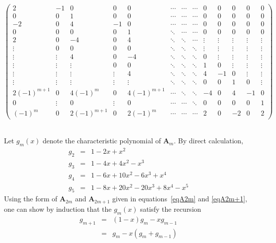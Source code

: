 \documentclass{amsart}
\begin{document}
\begin{tiny}

\begin{equation}\label{eqA2m+1}
\left( \begin{array}{ccccccccccccc}
    2&-1&0&0&0&\cdots&\cdots&\cdots&0&0&0&0&0\\
    0&0&1&0&0&\cdots&\cdots&\cdots&0&0&0&0&0\\
    -2&0&4&-1&0&\cdots&\cdots&\cdots&0&0&0&0&0\\
    0&0&0&0&1&\ddots&\cdots&\cdots&0&0&0&0&0\\
    2&0&-4&0&4&\ddots&\ddots&\cdots&\vdots&\vdots&\vdots&\vdots&\vdots\\
    \vdots&0&0&0&0&\ddots&\ddots&\ddots&\vdots&\vdots&\vdots&\vdots&\vdots
\\
   \vdots&\vdots&4&0&-4&\ddots&\ddots&\ddots&0&\vdots&\vdots&\vdots&\vdots
\\
   \vdots&\vdots&\vdots&0&0&\ddots&\ddots&\ddots&1&0&\vdots&\vdots&\vdots\\
    \vdots&\vdots&\vdots&\vdots&4&\ddots&\ddots&\ddots&4&-1&0&\vdots&\vdots
\\
    \vdots&\vdots&\vdots&\vdots&\vdots&\ddots&\ddots&\ddots&0&0&1&0&\vdots
\\
    2(-1)^{m+1}&0&4(-1)^{m}&0&4(-1)^{m+1}&\cdots&\ddots&\ddots&-4&0&4&-1&0\\
    0&\vdots&0&\vdots&0&\cdots&\cdots&\ddots&0&0&0&0&1\\
    (-1)^{m}&0&2(-1)^{m+1}&0&2(-1)^{m}&\cdots&\cdots&\cdots&2&0&-2&0&2
\end{array} \right)
\end{equation}\\
\end{tiny}

Let $g_m(x)$ denote the characteristic polynomial of ${{\mathbf A}}_m$. 
By direct calculation,
\begin{eqnarray*}
g_2 &=& 1 -2x + x^2\\
g_3 &=& 1-4x + 4x^2 -x^3\\
g_4 &=& 1-6x + 10x^2 - 6x^3 + x^4\\
g_5 &=& 1 -8x +20x^2 - 20x^3 + 8x^4-x^5
\end{eqnarray*}
Using the form of ${{\mathbf A}}_{2m}$ and ${{\mathbf A}}_{2m+1}$ given in equations~\ref{eqA2m}
and \ref{eqA2m+1}, one can show by induction that the $g_m(x)$ satisfy the recursion
\begin{eqnarray*}
g_{m+1} & = & (1-x) g_m - x g_{m-1} \\
& = & g_m - x(g_m + g_{m-1}) 
\end{eqnarray*}
\end{document}
